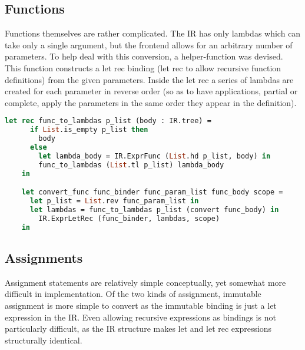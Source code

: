 \documentclass{l4proj}
\begin{document}
\subsection{Functions}
Functions themselves are rather complicated.
The IR has only lambdas which can take only a single argument, but the frontend allows for an arbitrary number of parameters.
To help deal with this conversion, a helper-function was devised.
This function constructs a let rec binding (let rec to allow recursive function definitions) from the given parameters.
Inside the let rec a series of lambdas are created for each parameter in reverse order (so as to have applications, partial or complete, apply the parameters in the same order they appear in the definition).
\begin{lstlisting}[language=Caml, keepspaces=true, caption=PyFunc frontend's function binding conversion code.]
    let rec func_to_lambdas p_list (body : IR.tree) =
      if List.is_empty p_list then
        body
      else
        let lambda_body = IR.ExprFunc (List.hd p_list, body) in
        func_to_lambdas (List.tl p_list) lambda_body
    in

    let convert_func func_binder func_param_list func_body scope =
      let p_list = List.rev func_param_list in
      let lambdas = func_to_lambdas p_list (convert func_body) in
        IR.ExprLetRec (func_binder, lambdas, scope)
    in
\end{lstlisting}


\subsection{Assignments}
Assignment statements are relatively simple conceptually, yet somewhat more difficult in implementation.
Of the two kinds of assignment, immutable assignment is more simple to convert as the immutable binding is just a let expression in the IR.
Even allowing recursive expressions as bindings is not particularly difficult, as the IR structure makes let and let rec expressions structurally identical.
\end{document}
